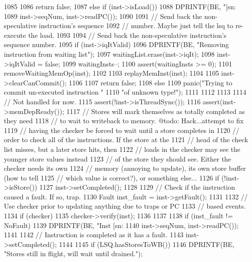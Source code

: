 \begin{DoxyCode}
{{{1085 
1086             return false;
1087         } else if (inst->isLoad()) {
1088             DPRINTF(BE, "[sn:%
1089                     inst->seqNum, inst->readPC());
1090 
1091             // Send back the non-speculative instruction's sequence
1092             // number.  Maybe just tell the lsq to re-execute the load.
1093 
1094             // Send back the non-speculative instruction's sequence number.
1095             if (inst->iqItValid) {
1096                 DPRINTF(BE, "Removing instruction from waiting list\n");
1097                 waitingList.erase(inst->iqIt);
1098                 inst->iqItValid = false;
1099                 waitingInsts--;
1100                 assert(waitingInsts >= 0);
1101                 removeWaitingMemOp(inst);
1102             }
1103             replayMemInst(inst);
1104 
1105             inst->clearCanCommit();
1106 
1107             return false;
1108         } else {
1109             panic("Trying to commit un-executed instruction "
1110                   "of unknown type!\n");
1111         }
1112     }
1113 
1114     // Not handled for now.
1115     assert(!inst->isThreadSync());
1116     assert(inst->memDepReady());
1117     // Stores will mark themselves as totally completed as they need
1118     // to wait to writeback to memory.  @todo: Hack...attempt to fix
1119     // having the checker be forced to wait until a store completes in
1120     // order to check all of the instructions.  If the store at the
1121     // head of the check list misses, but a later store hits, then
1122     // loads in the checker may see the younger store values instead
1123     // of the store they should see.  Either the checker needs its own
1124     // memory (annoying to update), its own store buffer (how to tell
1125     // which value is correct?), or something else...
1126     if (!inst->isStore()) {
1127         inst->setCompleted();
1128     }
1129     // Check if the instruction caused a fault.  If so, trap.
1130     Fault inst_fault = inst->getFault();
1131 
1132     // Use checker prior to updating anything due to traps or PC
1133     // based events.
1134     if (checker) {
1135         checker->verify(inst);
1136     }
1137 
1138     if (inst_fault != NoFault) {
1139         DPRINTF(BE, "Inst [sn:%
1140                 inst->seqNum, inst->readPC());
1141 
1142         // Instruction is completed as it has a fault.
1143         inst->setCompleted();
1144 
1145         if (LSQ.hasStoresToWB()) {
1146             DPRINTF(BE, "Stores still in flight, will wait until drained.\n");
}}}
\end{DoxyCode}
